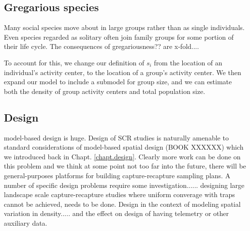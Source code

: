 \subsection{Gregarious species}

Many social species move about in large groups rather than as single
individuals. Even species regarded as solitary often join family
groups for some portion of their life cycle. The consequences of
gregariousness?? are x-fold....

To account for this, we change our definition of $s_i$ from the
location of an individual's activity center, to the location of a
group's activity center. We then expand our model to include a
submodel for group size, and we can estimate both the density of group
activity centers and total population size.

\subsection{Design}

model-based design is huge. Design of SCR studies is naturally
amenable to standard considerations of model-based spatial design
(BOOK XXXXXX) which we introduced back in
Chapt. \ref{chapt.design}. Clearly more work can be done on this
problem and we think at some point not too far into the future, there
will be general-purposes platforms for building capture-recapture
sampling plans. 
A number of specific design problems require some
investigation...... designing large landscape scale capture-recapture
studies where uniform converage with traps cannot be achieved, needs
to be done.  
Design in the context of modeling spatial variation in
density..... and the effect on design of having telemetry or other
auxiliary data. 


